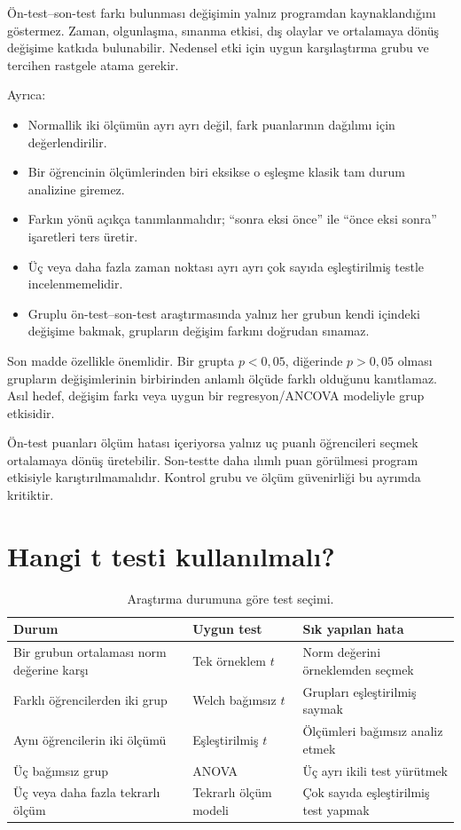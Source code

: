 Ön-test--son-test farkı bulunması değişimin yalnız programdan kaynaklandığını
göstermez. Zaman, olgunlaşma, sınanma etkisi, dış olaylar ve ortalamaya dönüş
değişime katkıda bulunabilir. Nedensel etki için uygun karşılaştırma grubu ve
tercihen rastgele atama gerekir.

Ayrıca:

\begin{itemize}
  \item Normallik iki ölçümün ayrı ayrı değil, fark puanlarının dağılımı için değerlendirilir.
  \item Bir öğrencinin ölçümlerinden biri eksikse o eşleşme klasik tam durum analizine giremez.
  \item Farkın yönü açıkça tanımlanmalıdır; ``sonra eksi önce'' ile ``önce eksi sonra'' işaretleri ters üretir.
  \item Üç veya daha fazla zaman noktası ayrı ayrı çok sayıda eşleştirilmiş testle incelenmemelidir.
  \item Gruplu ön-test--son-test araştırmasında yalnız her grubun kendi içindeki değişime bakmak, grupların değişim farkını doğrudan sınamaz.
\end{itemize}

Son madde özellikle önemlidir. Bir grupta $p<0{,}05$, diğerinde $p>0{,}05$
olması grupların değişimlerinin birbirinden anlamlı ölçüde farklı olduğunu
kanıtlamaz. Asıl hedef, değişim farkı veya uygun bir regresyon/ANCOVA modeliyle
grup etkisidir.

\begin{researchbox}
Ön-test puanları ölçüm hatası içeriyorsa yalnız uç puanlı öğrencileri seçmek
ortalamaya dönüş üretebilir. Son-testte daha ılımlı puan görülmesi program
etkisiyle karıştırılmamalıdır. Kontrol grubu ve ölçüm güvenirliği bu ayrımda
kritiktir.
\end{researchbox}

\section{Hangi t testi kullanılmalı?}

\begin{table}[htbp]
\centering
\caption{Araştırma durumuna göre test seçimi.}
\begin{tabular}{@{}p{}p{}p{}@{}}
\toprule
Durum & Uygun test & Sık yapılan hata \\
\midrule
Bir grubun ortalaması norm değerine karşı & Tek örneklem $t$ & Norm değerini örneklemden seçmek \\
Farklı öğrencilerden iki grup & Welch bağımsız $t$ & Grupları eşleştirilmiş saymak \\
Aynı öğrencilerin iki ölçümü & Eşleştirilmiş $t$ & Ölçümleri bağımsız analiz etmek \\
Üç bağımsız grup & ANOVA & Üç ayrı ikili test yürütmek \\
Üç veya daha fazla tekrarlı ölçüm & Tekrarlı ölçüm modeli & Çok sayıda eşleştirilmiş test yapmak \\
\bottomrule
\end{tabular}
\end{table}

